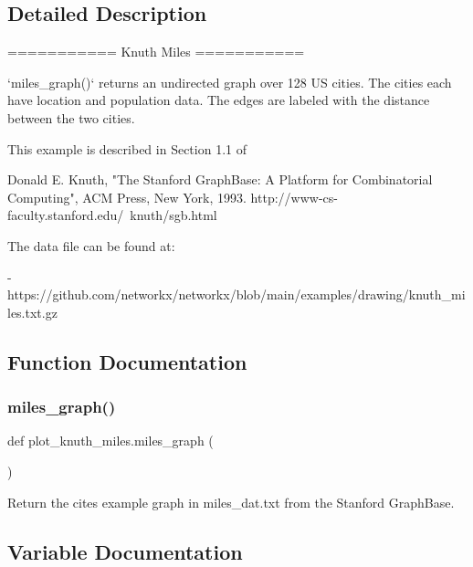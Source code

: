 \subsection{Detailed Description}
\begin{DoxyVerb}===========
Knuth Miles
===========

`miles_graph()` returns an undirected graph over 128 US cities. The
cities each have location and population data.  The edges are labeled with the
distance between the two cities.

This example is described in Section 1.1 of

Donald E. Knuth, "The Stanford GraphBase: A Platform for Combinatorial
Computing", ACM Press, New York, 1993.
http://www-cs-faculty.stanford.edu/~knuth/sgb.html

The data file can be found at:

- https://github.com/networkx/networkx/blob/main/examples/drawing/knuth_miles.txt.gz
\end{DoxyVerb}
 

\subsection{Function Documentation}
\mbox{\label{namespaceplot__knuth__miles_adc1cff9bd985e43d399b6000acc39271}} 
\subsubsection{\texorpdfstring{miles\+\_\+graph()}{miles\_graph()}}
{\footnotesize\ttfamily def plot\+\_\+knuth\+\_\+miles.\+miles\+\_\+graph (\begin{DoxyParamCaption}{ }\end{DoxyParamCaption})}

\begin{DoxyVerb}Return the cites example graph in miles_dat.txt
from the Stanford GraphBase.
\end{DoxyVerb}
 

\subsection{Variable Documentation}
\mbox{\label{namespaceplot__knuth__miles_aa86306e45ed386df81d325d6186e7e0f}} 
